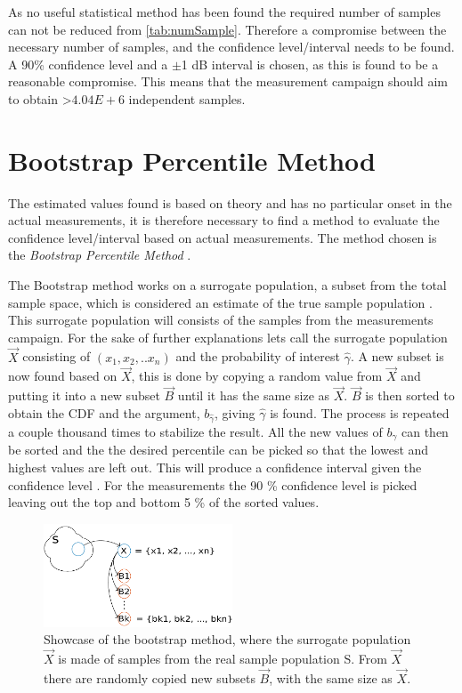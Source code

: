 As no useful statistical method has been found the required number of samples can not be reduced from \autoref{tab:numSample}. Therefore a compromise between the necessary number of samples, and the confidence level/interval needs to be found. A 90\% confidence level and a $\pm$1 dB interval is chosen, as this is found to be a reasonable compromise. This means that the measurement campaign should aim to obtain >$4.04E+6$ independent samples.


\section{Bootstrap Percentile Method}\label{sec_bootstrap}
The estimated values found is based on theory and has no particular onset in the actual measurements, it is therefore necessary to find a method to evaluate the confidence level/interval based on actual measurements. The method chosen is the \textit{Bootstrap Percentile Method} \citep{Bootstrap}.

The Bootstrap method works on a surrogate population, a subset from the total sample space, which is considered an estimate of the true sample population \citep{Bootstrap}. This surrogate population will consists of the samples from the measurements campaign. For the sake of further explanations lets call the surrogate population $\overrightarrow{X}$ consisting of $(x_1, x_2,..x_n)$ and the probability of interest $\hat{\gamma}$. A new subset is now found based on $\overrightarrow{X}$, this is done by copying a random value from $\overrightarrow{X}$ and putting it into a new subset $\overrightarrow{B}$ until it has the same size as $\overrightarrow{X}$. $\overrightarrow{B}$ is then sorted to obtain the \gls{CDF} and the argument, $b_{\hat{\gamma}}$, giving $\hat{\gamma}$ is found. The process is repeated a couple thousand times to stabilize the result. All the new values of $b_{\hat{\gamma}}$ can then be sorted and the the desired percentile can be picked so that the lowest and highest values are left out. This will produce a confidence interval given the confidence level \citep{Bootstrap}. For the measurements the 90 \% confidence level is picked leaving out the top and bottom 5 \% of the sorted values.

\begin{figure}[H]
\centering
\includegraphics[width=0.5\textwidth]{figures/Bootstrap.pdf}
\caption{Showcase of the bootstrap method, where the surrogate population $\vec{X}$ is made of samples from the real sample population S. From $\vec{X}$ there are randomly copied new subsets $\vec{B}$, with the same size as $\vec{X}$.}
\label{BSEX}
\end{figure}

